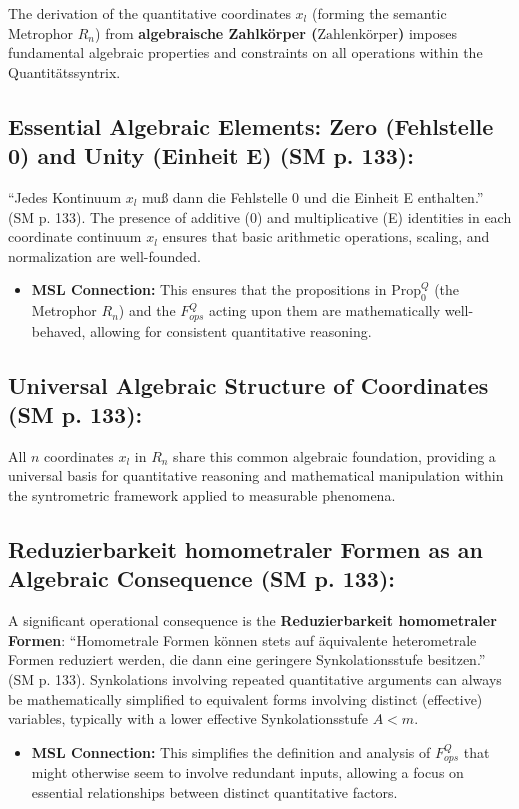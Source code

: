 \documentclass[
    12pt,              %
    a4paper,           %
    headings=normal,   %
    twoside=true,      %
    BCOR=8mm,          %
]{scrbook}
\newcommand{\q}[1]{\enquote{#1}}
\newcommand{\synkolationsstufe}{m}
\newcommand{\zahlenkoerper}{\text{Zahlenkörper}}
\newcommand{\semantischermetrophor}{R_n}
\newcommand{\Propk}[1]{\text{Prop}_{#1}}
\begin{document}
The derivation of the quantitative coordinates \(x_l\) (forming the semantic Metrophor \(\semantischermetrophor\)) from \textbf{algebraische Zahlkörper (\(\zahlenkoerper\))} imposes fundamental algebraic properties and constraints on all operations within the Quantitätssyntrix.

\subsection{Essential Algebraic Elements: Zero (Fehlstelle 0) and Unity (Einheit E) (SM p. 133):}
\label{sec:ch8_3_1_zero_unity}
\q{Jedes Kontinuum \(x_l\) muß dann die Fehlstelle 0 und die Einheit E enthalten.} (SM p. 133). The presence of additive (0) and multiplicative (E) identities in each coordinate continuum \(x_l\) ensures that basic arithmetic operations, scaling, and normalization are well-founded.
\begin{itemize}
    \item   \textbf{MSL Connection:} This ensures that the propositions in \(\Propk{0}^Q\) (the Metrophor \(\semantischermetrophor\)) and the \(F_{ops}^Q\) acting upon them are mathematically well-behaved, allowing for consistent quantitative reasoning.
\end{itemize}

\subsection{Universal Algebraic Structure of Coordinates (SM p. 133):}
\label{sec:ch8_3_2_universal_algebraic}
All \(n\) coordinates \(x_l\) in \(\semantischermetrophor\) share this common algebraic foundation, providing a universal basis for quantitative reasoning and mathematical manipulation within the syntrometric framework applied to measurable phenomena.

\subsection{Reduzierbarkeit homometraler Formen as an Algebraic Consequence (SM p. 133):}
\label{sec:ch8_3_3_reduzierbarkeit_homometral}
A significant operational consequence is the \textbf{Reduzierbarkeit homometraler Formen}: \q{Homometrale Formen können stets auf äquivalente heterometrale Formen reduziert werden, die dann eine geringere Synkolationsstufe besitzen.} (SM p. 133). Synkolations involving repeated quantitative arguments can always be mathematically simplified to equivalent forms involving distinct (effective) variables, typically with a lower effective Synkolationsstufe \(A < \synkolationsstufe\).
\begin{itemize}
    \item   \textbf{MSL Connection:} This simplifies the definition and analysis of \(F_{ops}^Q\) that might otherwise seem to involve redundant inputs, allowing a focus on essential relationships between distinct quantitative factors.
\end{itemize}
\end{document}
